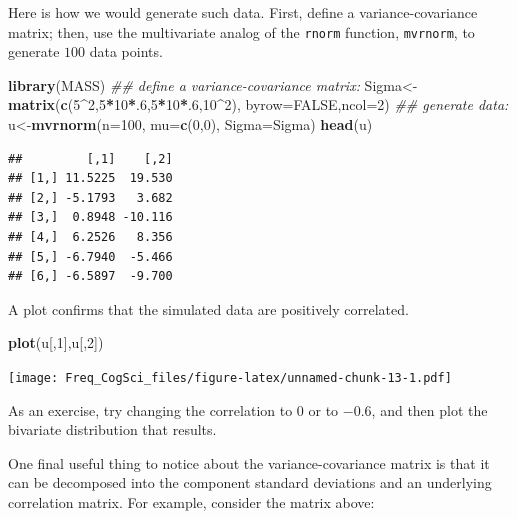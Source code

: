 \documentclass[12pt,]{krantz}
\newenvironment{Shaded}{\begin{snugshade}}{\end{snugshade}}
\newcommand{\CommentTok}[1]{\textcolor[rgb]{0.56,0.35,0.01}{\textit{#1}}}
\newcommand{\DataTypeTok}[1]{\textcolor[rgb]{0.13,0.29,0.53}{#1}}
\newcommand{\DecValTok}[1]{\textcolor[rgb]{0.00,0.00,0.81}{#1}}
\newcommand{\KeywordTok}[1]{\textcolor[rgb]{0.13,0.29,0.53}{\textbf{#1}}}
\newcommand{\NormalTok}[1]{#1}
\newcommand{\OperatorTok}[1]{\textcolor[rgb]{0.81,0.36,0.00}{\textbf{#1}}}
\newcommand{\OtherTok}[1]{\textcolor[rgb]{0.56,0.35,0.01}{#1}}
\begin{document}
Here is how we would generate such data. First, define a variance-covariance matrix; then, use the multivariate analog of the \texttt{rnorm} function, \texttt{mvrnorm}, to generate \(100\) data points.

\begin{Shaded}
\begin{Highlighting}[]
\KeywordTok{library}\NormalTok{(MASS)}
\CommentTok{## define a variance-covariance matrix:}
\NormalTok{Sigma<-}\KeywordTok{matrix}\NormalTok{(}\KeywordTok{c}\NormalTok{(}\DecValTok{5}\OperatorTok{^}\DecValTok{2}\NormalTok{,}\DecValTok{5}\OperatorTok{*}\DecValTok{10}\OperatorTok{*}\NormalTok{.}\DecValTok{6}\NormalTok{,}\DecValTok{5}\OperatorTok{*}\DecValTok{10}\OperatorTok{*}\NormalTok{.}\DecValTok{6}\NormalTok{,}\DecValTok{10}\OperatorTok{^}\DecValTok{2}\NormalTok{),}
              \DataTypeTok{byrow=}\OtherTok{FALSE}\NormalTok{,}\DataTypeTok{ncol=}\DecValTok{2}\NormalTok{)}
\CommentTok{## generate data:}
\NormalTok{u<-}\KeywordTok{mvrnorm}\NormalTok{(}\DataTypeTok{n=}\DecValTok{100}\NormalTok{,}
           \DataTypeTok{mu=}\KeywordTok{c}\NormalTok{(}\DecValTok{0}\NormalTok{,}\DecValTok{0}\NormalTok{),}
           \DataTypeTok{Sigma=}\NormalTok{Sigma)}
\KeywordTok{head}\NormalTok{(u)}
\end{Highlighting}
\end{Shaded}

\begin{verbatim}
##         [,1]    [,2]
## [1,] 11.5225  19.530
## [2,] -5.1793   3.682
## [3,]  0.8948 -10.116
## [4,]  6.2526   8.356
## [5,] -6.7940  -5.466
## [6,] -6.5897  -9.700
\end{verbatim}

A plot confirms that the simulated data are positively correlated.

\begin{Shaded}
\begin{Highlighting}[]
\KeywordTok{plot}\NormalTok{(u[,}\DecValTok{1}\NormalTok{],u[,}\DecValTok{2}\NormalTok{])}
\end{Highlighting}
\end{Shaded}

\texttt{[image: Freq\_CogSci\_files/figure-latex/unnamed-chunk-13-1.pdf]}

As an exercise, try changing the correlation to \(0\) or to \(-0.6\), and then plot the bivariate distribution that results.

One final useful thing to notice about the variance-covariance matrix is that it can be decomposed into the component standard deviations and an underlying correlation matrix. For example, consider the matrix above:
\end{document}
